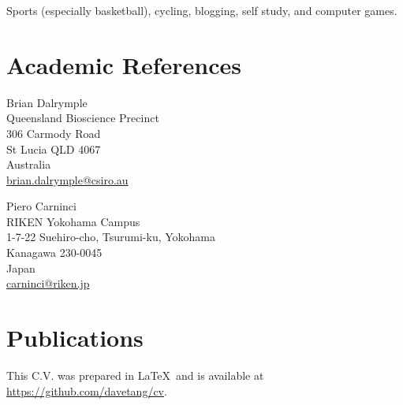 \documentclass[a4paper, 11pt]{article}
\begin{document}
Sports (especially basketball), cycling, blogging, self study, and computer games.

\section*{Academic References}

\begin{minipage}[ht]{.50\textwidth}
Brian Dalrymple \\
Queensland Bioscience Precinct \\
306 Carmody Road \\
St Lucia QLD 4067 \\
Australia \\
\href{mailto:brian.dalrymple@csiro.au}{brian.dalrymple@csiro.au}
\end{minipage}
\begin{minipage}[ht]{.50\textwidth}
Piero Carninci \\
RIKEN Yokohama Campus \\
1-7-22 Suehiro-cho, Tsurumi-ku, Yokohama \\
Kanagawa 230-0045 \\
Japan \\
\href{mailto:carninci@riken.jp}{carninci@riken.jp}
\end{minipage}

\section*{Publications}
\begingroup
   \renewcommand{\section}[2]{}%
   
   \nocite{*}
   
\endgroup

\vfill

\footnotesize
This C.V. was prepared in \LaTeX\ and is available at \href{https://github.com/davetang/cv}{https://github.com/davetang/cv}.
\end{document}
